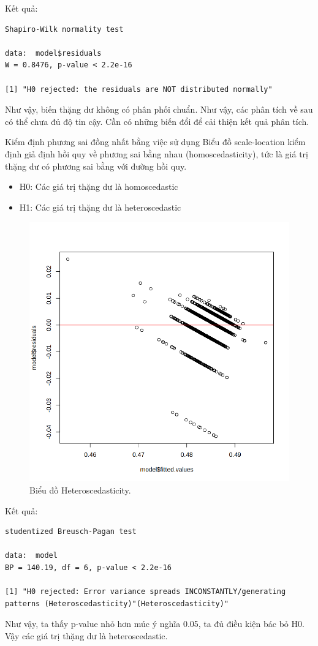 Kết quả:
\begin{lstlisting}
Shapiro-Wilk normality test

data:  model$residuals
W = 0.8476, p-value < 2.2e-16

[1] "H0 rejected: the residuals are NOT distributed normally"
\end{lstlisting}
Như vậy, biến thặng dư không có phân phối chuẩn. Như vậy, các phân tích về sau có thể chưa đủ độ tin cậy. Cần có những biến đổi để cải thiện kết quả phân tích.

Kiểm định phương sai đồng nhất bằng việc sử dụng Biểu đồ scale-location kiểm định giả định hồi quy về phương sai bằng nhau (homoscedasticity), tức là giá trị thặng dư có phương sai bằng với đường hồi quy.
\begin{itemize}
    \item H0: Các giá trị thặng dư là homoscedastic
    \item H1: Các giá trị thặng dư là heteroscedastic
\end{itemize}
\begin{figure}[H]
    \centering
    \includegraphics[width=0.75\columnwidth]{wine_figures/white_scale_test.png}
    \caption{Biểu đồ Heteroscedasticity.}
    \label{fig:white_scale_test}
\end{figure}
Kết quả:
\begin{lstlisting}
studentized Breusch-Pagan test

data:  model
BP = 140.19, df = 6, p-value < 2.2e-16

[1] "H0 rejected: Error variance spreads INCONSTANTLY/generating patterns (Heteroscedasticity)"(Heteroscedasticity)"
\end{lstlisting}
Như vậy, ta thấy p-value nhỏ hơn múc ý nghĩa 0.05, ta đủ điều kiện bác bỏ H0. Vậy các giá trị thặng dư là heteroscedastic.


